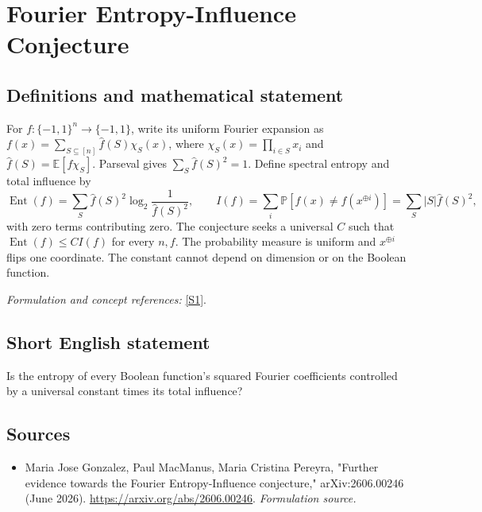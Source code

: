 \documentclass[11pt]{article}
\begin{document}
\section*{\texorpdfstring{Fourier Entropy-Influence Conjecture}{Fourier Entropy-Influence Conjecture}}\label{412}
\subsection{Definitions and mathematical statement}
For $f:\{-1,1\}^n\to\{-1,1\}$, write its uniform Fourier expansion as $f(x)=\sum_{S\subseteq[n]}\widehat f(S)\chi_S(x)$, where $\chi_S(x)=\prod_{i\in S}x_i$ and $\widehat f(S)={\mathbb{E}}[f\chi_S]$. Parseval gives $\sum_S\widehat f(S)^2=1$. Define spectral entropy and total influence by
\[
 \operatorname{Ent}(f)=\sum_S\widehat f(S)^2
 \log_2\frac1{\widehat f(S)^2},\qquad
 I(f)=\sum_i{\mathbb{P}}[f(x)\ne f(x^{\oplus i})]
 =\sum_S|S|\widehat f(S)^2,
\]
with zero terms contributing zero. The conjecture seeks a universal $C$ such that $\operatorname{Ent}(f)\le C I(f)$ for every $n,f$. The probability measure is uniform and $x^{\oplus i}$ flips one coordinate. The constant cannot depend on dimension or on the Boolean function.
\par\smallskip\textit{Formulation and concept references:} \href{https://arxiv.org/abs/2606.00246}{[S1]}.

\subsection{Short English statement}
Is the entropy of every Boolean function's squared Fourier coefficients controlled by a universal constant times its total influence?
\subsection{Sources}
\begin{itemize}
\item[S1]Maria Jose Gonzalez, Paul MacManus, Maria Cristina Pereyra, "Further evidence towards the Fourier Entropy-Influence conjecture," arXiv:2606.00246 (June 2026).
\url{https://arxiv.org/abs/2606.00246}.
\textit{Formulation source.}
\end{itemize}
\end{document}
